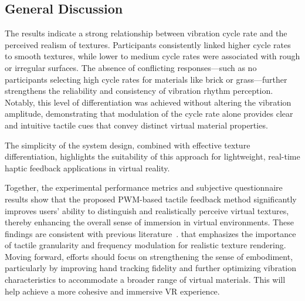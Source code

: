 \subsection{General Discussion}  
The results indicate a strong relationship between vibration cycle rate and the perceived realism of textures. Participants consistently linked higher cycle rates to smooth textures, while lower to medium cycle rates were associated with rough or irregular surfaces. The absence of conflicting responses—such as no participants selecting high cycle rates for materials like brick or grass—further strengthens the reliability and consistency of vibration rhythm perception. Notably, this level of differentiation was achieved without altering the vibration amplitude, demonstrating that modulation of the cycle rate alone provides clear and intuitive tactile cues that convey distinct virtual material properties. 

The simplicity of the system design, combined with effective texture differentiation, highlights the suitability of this approach for lightweight, real-time haptic feedback applications in virtual reality.

Together, the experimental performance metrics and subjective questionnaire results show that the proposed PWM-based tactile feedback method significantly improves users' ability to distinguish and realistically perceive virtual textures, thereby enhancing the overall sense of immersion in virtual environments. These findings are consistent with previous literature~\cite{10.1145/3025453.3025812,10.1007/s00542-023-05486-x}.  that emphasizes the importance of tactile granularity and frequency modulation for realistic texture rendering. Moving forward, efforts should focus on strengthening the sense of embodiment, particularly by improving hand tracking fidelity and further optimizing vibration characteristics to accommodate a broader range of virtual materials. This will help achieve a more cohesive and immersive VR experience.



